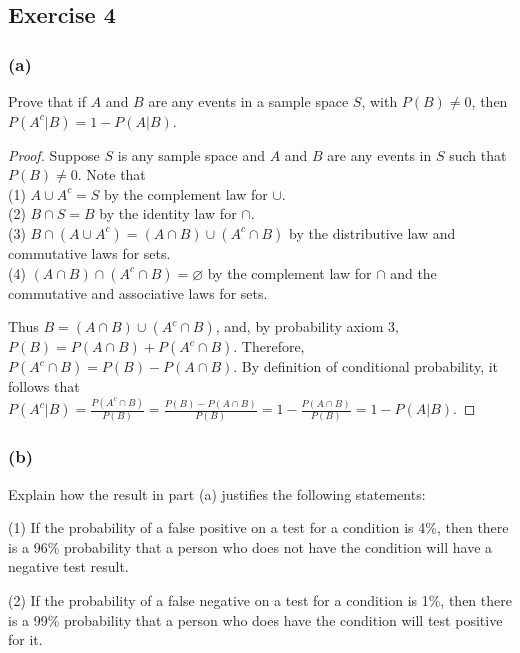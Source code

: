 \documentclass[14pt]{extarticle}
\newcommand{\es}{\varnothing}
\begin{document}
\subsection{Exercise 4}
\subsubsection{(a)}
Prove that if \(A\) and \(B\) are any events in a sample space \(S\), with \(P(B) \neq 0\), then \(P(A^c | B) = 1 - P(A|B)\).

\begin{proof}
     Suppose \(S\) is any sample space and \(A\) and \(B\) are any events in \(S\) such that \(P(B) \neq 0\). Note that \\
     (1) \(A \cup A^c = S\) by the complement law for \(\cup\). \\
     (2) \(B \cap S = B\) by the identity law for \(\cap\). \\
     (3) \(B \cap (A \cup A^c) = (A \cap B) \cup (A^c \cap B)\) by the distributive law and commutative laws for sets. \\
     (4) \((A \cap B) \cap (A^c \cap B) = \es\) by the complement law for \(\cap\) and the commutative and associative laws for
     sets.

     Thus \(B = (A \cap B) \cup (A^c \cap B)\), and, by probability axiom 3, \(P(B) = P (A \cap B) + P (A^c \cap B)\). Therefore,
     \(P(A^c \cap B) = P(B) - P(A \cap B)\). By definition of conditional probability, it follows that \(P(A^c | B) =
     \frac{P(A^c \cap B)}{P(B)} = \frac{P(B) - P(A \cap B)}{P(B)} = 1 - \frac{P(A \cap B)}{P(B)} = 1 - P(A | B)\).
\end{proof}

\subsubsection{(b)}
Explain how the result in part (a) justifies the following statements:

(1) If the probability of a false positive on a test for a condition is 4\%, then there is a 96\% probability that a
person who does not have the condition will have a negative test result.

(2) If the probability of a false negative on a test for a condition is 1\%, then there is a 99\% probability that a
person who does have the condition will test positive for it.
\end{document}
